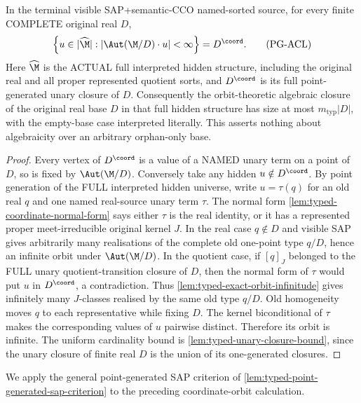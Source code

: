 \begin{corollary}
\label{cor:typed-no-real-base-hidden-algebraicity}
In the terminal visible SAP+semantic-CCO named-sorted source,
for every finite COMPLETE original real $D$,
\[
 \left\{u\in|\widehat\M|:
       |\Aut(\M/D)\cdot u|<\infty\right\}
                =D^{\coord}.
 \tag{PG-ACL}\label{eq:typed-no-real-base-hidden-algebraicity}
\]
Here $\widehat\M$ is the ACTUAL full interpreted hidden
structure, including the original real and all proper
represented quotient sorts, and $D^{\coord}$ is its full
point-generated unary closure of $D$.  Consequently
the orbit-theoretic algebraic closure of the original
real base $D$ in that full hidden structure has size
at most $m_{\mathrm{typ}}|D|$, with the empty-base
case interpreted literally. This asserts nothing
about algebraicity over an arbitrary orphan-only base.
\end{corollary}
\begin{proof}
Every vertex of $D^{\coord}$ is a value of a NAMED
unary term on a point of $D$, so is fixed by
$\Aut(\M/D)$.  Conversely take any hidden
$u\notin D^{\coord}$. By point generation of the
FULL interpreted hidden universe, write
$u=\tau(q)$ for an old real $q$ and one named
real-source unary term $\tau$.
The normal form \cref{lem:typed-coordinate-normal-form}
says either $\tau$ is the real identity, or it
has a represented proper meet-irreducible
original kernel $J$.
In the real case $q\notin D$ and visible SAP
gives arbitrarily many realisations of the
complete old one-point type $q/D$, hence
an infinite orbit under $\Aut(\M/D)$.
In the quotient case, if $[q]_J$ belonged
to the FULL unary quotient-transition closure of
$D$, then the normal form of $\tau$ would
put $u$ in $D^{\coord}$, a contradiction.
Thus \cref{lem:typed-exact-orbit-infinitude}
gives infinitely many $J$-classes realised by
the same old type $q/D$.  Old homogeneity
moves $q$ to each representative while
fixing $D$. The kernel biconditional of
$\tau$ makes the corresponding values of
$u$ pairwise distinct.  Therefore its
orbit is infinite. The uniform cardinality
bound is \cref{lem:typed-unary-closure-bound},
since the unary closure of finite real $D$
is the union of its one-generated closures.
\end{proof}

We apply the general point-generated SAP criterion of
\cref{lem:typed-point-generated-sap-criterion} to the preceding
coordinate-orbit calculation.


